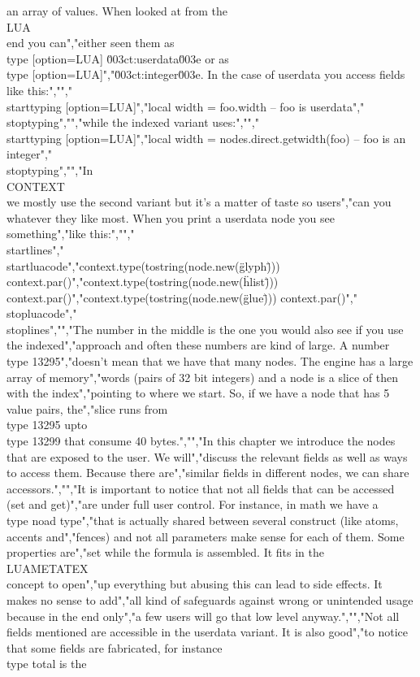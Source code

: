 an array of values. When looked at from the \\LUA\\ end you can","either seen them as \\type [option=LUA] {\u003ct:userdata\u003e} or as \\type [option=LUA]","{\u003ct:integer\u003e}. In the case of userdata you access fields like this:","","\\starttyping [option=LUA]","local width = foo.width -- foo is userdata","\\stoptyping","","while the indexed variant uses:","","\\starttyping [option=LUA]","local width = nodes.direct.getwidth(foo) -- foo is an integer","\\stoptyping","","In \\CONTEXT\\ we mostly use the second variant but it's a matter of taste so users","can you whatever they like most. When you print a userdata node you see something","like this:","","\\startlines","\\startluacode","context.type(tostring(node.new(\"glyph\"))) context.par()","context.type(tostring(node.new(\"hlist\"))) context.par()","context.type(tostring(node.new(\"glue\" ))) context.par()","\\stopluacode","\\stoplines","","The number in the middle is the one you would also see if you use the indexed","approach and often these numbers are kind of large. A number \\type {13295}","doesn't mean that we have that many nodes. The engine has a large array of memory","words (pairs of 32 bit integers) and a node is a slice of then with the index","pointing to where we start. So, if we have a node that has 5 value pairs, the","slice runs from \\type {13295} upto \\type {13299} that consume 40 bytes.","","In this chapter we introduce the nodes that are exposed to the user. We will","discuss the relevant fields as well as ways to access them. Because there are","similar fields in different nodes, we can share accessors.","","It is important to notice that not all fields that can be accessed (set and get)","are under full user control. For instance, in math we have a \\type {noad} type","that is actually shared between several construct (like atoms, accents and","fences) and not all parameters make sense for each of them. Some properties are","set while the formula is assembled. It fits in the \\LUAMETATEX\\ concept to open","up everything but abusing this can lead to side effects. It makes no sense to add","all kind of safeguards against wrong or unintended usage because in the end only","a few users will go that low level anyway.","","Not all fields mentioned are accessible in the userdata variant. It is also good","to notice that some fields are fabricated, for instance \\type {total} is the 